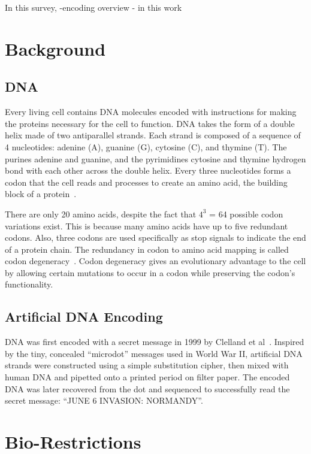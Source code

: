 \documentclass[USenglish,oneside,twocolumn]{article}
\begin{document}
In this survey,
-encoding overview
- in this work


\section{Background}

\subsection{DNA}

Every living cell contains DNA molecules encoded with instructions for making the proteins necessary for the cell to function. DNA takes the form of a double helix made of two antiparallel strands. Each strand is composed of a sequence of 4 nucleotides: adenine (A), guanine (G), cytosine (C), and thymine (T). The purines adenine and guanine, and the pyrimidines cytosine and thymine hydrogen bond with each other across the double helix. Every three nucleotides forms a codon that the cell reads and processes to create an amino acid, the building block of a protein~\cite{WC1953N}.

There are only 20 amino acids, despite the fact that $4^3$ = 64 possible codon variations exist. This is because many amino acids have up to five redundant codons. Also, three codons are used specifically as stop signals to indicate the end of a protein chain. The redundancy in codon to amino acid mapping is called codon degeneracy~\cite{WBBGLL2008}. Codon degeneracy gives an evolutionary advantage to the cell by allowing certain mutations to occur in a codon while preserving the codon’s functionality.

\subsection{Artificial DNA Encoding}

 DNA was first encoded with a secret message in 1999 by Clelland et al~\cite{CRB1999N}. Inspired by the tiny, concealed “microdot” messages used in World War II, artificial DNA strands were constructed using a simple substitution cipher, then mixed with human DNA and pipetted onto a printed period on filter paper. The encoded DNA was later recovered from the dot and sequenced to successfully read the secret message: “JUNE 6 INVASION: NORMANDY”.

\section{Bio-Restrictions}
\end{document}
